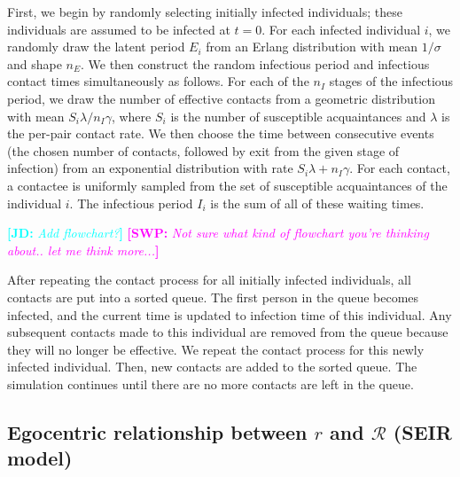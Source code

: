 \documentclass[12pt]{article}
\newcommand{\RR}{\ensuremath{{\mathcal R}}}
\newcommand{\comment}[3]{\textcolor{#1}{\textbf{[#2: }\textsl{#3}\textbf{]}}}
\newcommand{\jd}[1]{\comment{cyan}{JD}{#1}}
\newcommand{\swp}[1]{\comment{magenta}{SWP}{#1}}
\begin{document}
First, we begin by randomly selecting initially infected individuals; these individuals are assumed to be infected at $t = 0$.
For each infected individual $i$, we randomly draw the latent period $E_i$ from an Erlang distribution with mean $1/\sigma$ and shape $n_E$.
We then construct the random infectious period and infectious contact times simultaneously as follows.
For each of the $n_I$ stages of the infectious period, we draw the number of effective contacts from a geometric distribution with mean $S_i \lambda / n_I\gamma$, where $S_i$ is the number
of susceptible acquaintances and $\lambda$ is the per-pair contact rate.
We then choose the time between consecutive events (the chosen number of contacts, followed by exit from the given stage of infection) from an exponential distribution with rate $S_i \lambda + n_I\gamma$.
For each contact, a contactee is uniformly sampled from the set of susceptible acquaintances of the individual $i$.
The infectious period $I_i$ is the sum of all of these waiting times.

\jd{Add flowchart?}
\swp{Not sure what kind of flowchart you're thinking about.. let me think more...}

After repeating the contact process for all initially infected individuals, all contacts are put into a sorted queue.
The first person in the queue becomes infected, and the current time is updated to infection time of this individual. 
Any subsequent contacts made to this individual are removed from the queue because they will no longer be effective.
We repeat the contact process for this newly infected individual.
Then, new contacts are added to the sorted queue.
The simulation continues until there are no more contacts are left in the queue.

\subsection{Egocentric relationship between $r$ and $\RR$ (SEIR model)}
\end{document}
